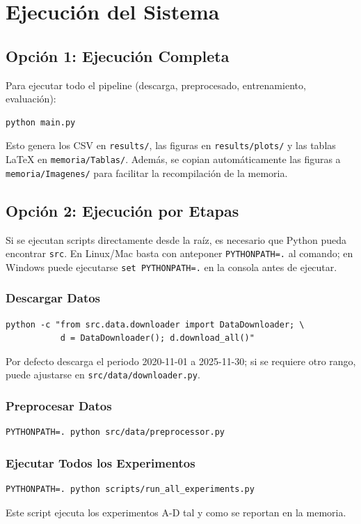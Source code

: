 \section{Ejecución del Sistema}

\subsection{Opción 1: Ejecución Completa}

Para ejecutar todo el pipeline (descarga, preprocesado, entrenamiento, evaluación):

\begin{verbatim}
python main.py
\end{verbatim}
Esto genera los CSV en \texttt{results/}, las figuras en \texttt{results/plots/} y las tablas LaTeX en \texttt{memoria/Tablas/}. Además, se copian automáticamente las figuras a \texttt{memoria/Imagenes/} para facilitar la recompilación de la memoria.

\subsection{Opción 2: Ejecución por Etapas}

Si se ejecutan scripts directamente desde la raíz, es necesario que Python pueda encontrar \texttt{src}. En Linux/Mac basta con anteponer \texttt{PYTHONPATH=.} al comando; en Windows puede ejecutarse \texttt{set PYTHONPATH=.} en la consola antes de ejecutar.

\subsubsection{Descargar Datos}
\begin{verbatim}
python -c "from src.data.downloader import DataDownloader; \
           d = DataDownloader(); d.download_all()"
\end{verbatim}
Por defecto descarga el periodo 2020-11-01 a 2025-11-30; si se requiere otro rango, puede ajustarse en \texttt{src/data/downloader.py}.

\subsubsection{Preprocesar Datos}
\begin{verbatim}
PYTHONPATH=. python src/data/preprocessor.py
\end{verbatim}

\subsubsection{Ejecutar Todos los Experimentos}
\begin{verbatim}
PYTHONPATH=. python scripts/run_all_experiments.py
\end{verbatim}
Este script ejecuta los experimentos A-D tal y como se reportan en la memoria.

